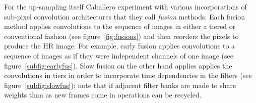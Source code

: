 
For the up-sampling itself Caballero \etal experiment with various incorporations of sub-pixel convolution architectures that they call \textit{fusion} methods.
%
Each fusion method applies convolutions to the sequence of images in either a tiered or conventional fashion (see figure~\ref{fig:fusions}) and then reorders the pixels to produce the HR image.
%
For example, early fusion applies convolutions to a sequence of images as if they were independent channels of one image (see figure~\ref{subfig:earlyfus}).
%
Slow fusion on the other hand applies applies the convolutions in tiers in order to incorporate time dependencies in the filters (see figure~\ref{subfig:slowfus}); note that if adjacent filter banks are made to share weights than as new frames come in operations can be recycled.
